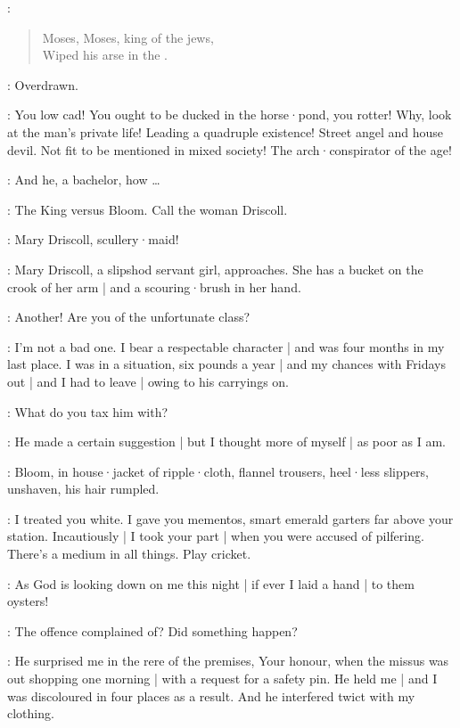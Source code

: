 \GalleryVoice:
\begin{verse}
    Moses, Moses, king of the jews,\\
    Wiped his arse in the .
\end{verse}

\Bloom:
Overdrawn.

\Beaufoy:
You low cad!
You ought to be ducked in the horse·pond,
you rotter!
Why,
look at the man's private life!
Leading a quadruple existence!
Street angel and house devil.
Not fit to be mentioned in mixed society!
The arch·conspirator of the age!

\Bloom:
And he,
a bachelor,
how \ldots

\FirstWatch:
The King versus Bloom.
Call the woman Driscoll.

\Crier:
Mary Driscoll,
scullery·maid!

:
Mary Driscoll,
a slipshod servant girl,
approaches.
She has a bucket on the crook of her arm |
and a scouring·brush in her hand.

\SecondWatch:
Another!
Are you of the unfortunate class?

\Driscoll[1]:
I'm not a bad one.
I bear a respectable character |
and was four months in my last place.
I was in a situation,
six pounds a year |
and my chances with Fridays out |
and I had to leave |
owing to his carryings on.

\FirstWatch:
What do you tax him with?

\Driscoll:
He made a certain suggestion |
but I thought more of myself |
as poor as I am.

:
Bloom,
in house·jacket of ripple·cloth,
flannel trousers,
heel·less slippers,
unshaven,
his hair rumpled.

\Bloom:
I treated you white.
I gave you mementos,
smart emerald garters far above your station.
Incautiously |
I took your part |
when you were accused of pilfering.
There's a medium in all things.
Play cricket.

\Driscoll:
As God is looking down on me this night |
if ever I laid a hand |
to them oysters!

\FirstWatch:
The offence complained of?
Did something happen?

\Driscoll:
He surprised me in the rere of the premises,
Your honour,
when the missus was out shopping one morning |
with a request for a safety pin.
He held me |
and I was discoloured in four places as a result.
And he interfered twict with my clothing.

